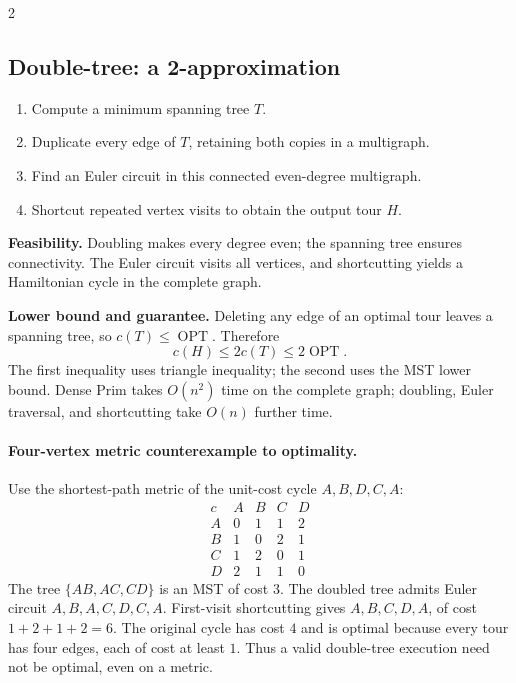 \documentclass[10pt]{article}
\theoremstyle{definition}
\newcommand{\OPT}{\operatorname{OPT}}
\begin{document}
\begin{multicols*}{2}
\subsection{Double-tree: a 2-approximation}\label{tsp:doubletree}
\begin{enumerate}
  \item Compute a minimum spanning tree $T$.
  \item Duplicate every edge of $T$, retaining both copies in a multigraph.
  \item Find an Euler circuit in this connected even-degree multigraph.
  \item Shortcut repeated vertex visits to obtain the output tour $H$.
\end{enumerate}
\textbf{Feasibility.} Doubling makes every degree even; the spanning tree
ensures connectivity.  The Euler circuit visits all vertices, and
shortcutting yields a Hamiltonian cycle in the complete graph.

\textbf{Lower bound and guarantee.} Deleting any edge of an optimal tour
leaves a spanning tree, so $c(T)\le\OPT$.  Therefore
\[
\boxed{\ c(H)\le 2c(T)\le2\OPT.\ }
\]
The first inequality uses triangle inequality; the second uses the MST lower
bound.  Dense Prim takes $O(n^2)$ time on the complete graph; doubling,
Euler traversal, and shortcutting take $O(n)$ further time.

\paragraph{Four-vertex metric counterexample to optimality.}
Use the shortest-path metric of the unit-cost cycle $A,B,D,C,A$:
\[
\begin{array}{c|rrrr}
c & A&B&C&D\\\hline
A&0&1&1&2\\
B&1&0&2&1\\
C&1&2&0&1\\
D&2&1&1&0
\end{array}
\]
The tree $\{AB,AC,CD\}$ is an MST of cost $3$.  The doubled tree admits
Euler circuit $A,B,A,C,D,C,A$.  First-visit shortcutting gives
$A,B,C,D,A$, of cost $1+2+1+2=6$.  The original cycle has cost $4$ and is
optimal because every tour has four edges, each of cost at least $1$.
Thus a valid double-tree execution need not be optimal, even on a metric.


\end{multicols*}
\end{document}
